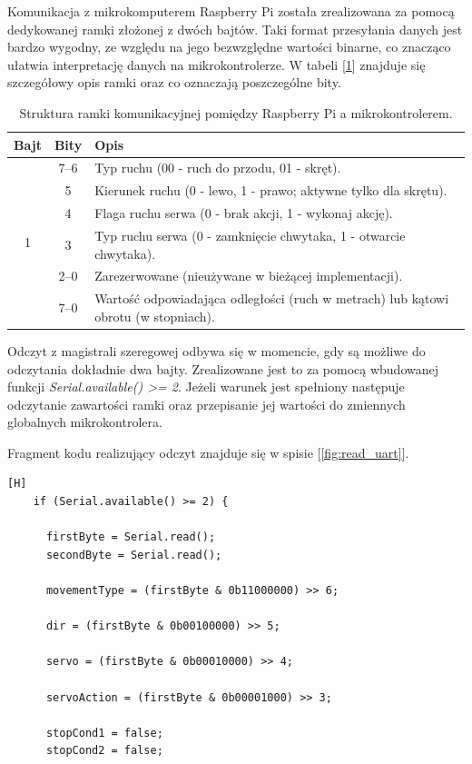 Komunikacja z mikrokomputerem Raspberry Pi została zrealizowana za pomocą dedykowanej ramki złożonej z dwóch bajtów. Taki format przesyłania danych jest bardzo wygodny, ze względu na jego bezwzględne wartości binarne, co znacząco ułatwia interpretację danych na mikrokontrolerze. W tabeli [\ref{tab:komunikacja_ramka}] znajduje się szczegółowy opis ramki oraz co oznaczają poszczególne bity. 

\begin{table}[H]
  \centering
  \begin{tabular}{|c|c|p{10cm}|}
      \hline
      \textbf{Bajt} & \textbf{Bity} & \textbf{Opis} \\
      \hline
      \multirow{8}{*}{1} & 7--6 & Typ ruchu (00 - ruch do przodu, 01 - skręt). \\
      \cline{2-3}
                        & 5    & Kierunek ruchu (0 - lewo, 1 - prawo; aktywne tylko dla skrętu). \\
      \cline{2-3}
                        & 4    & Flaga ruchu serwa (0 - brak akcji, 1 - wykonaj akcję). \\
      \cline{2-3}
                        & 3    & Typ ruchu serwa (0 - zamknięcie chwytaka, 1 - otwarcie chwytaka). \\
      \cline{2-3}
                        & 2--0 & Zarezerwowane (nieużywane w bieżącej implementacji). \\
      \hline
      \multirow{8}{*}{1} & 7--0 & Wartość odpowiadająca odległości (ruch w metrach) lub kątowi obrotu (w stopniach). \\
      \hline
  \end{tabular}
  \caption{Struktura ramki komunikacyjnej pomiędzy Raspberry Pi a mikrokontrolerem.}
  \label{tab:komunikacja_ramka}
\end{table}

Odczyt z magistrali szeregowej odbywa się w momencie, gdy są możliwe do odczytania dokładnie dwa bajty. Zrealizowane jest to za pomocą wbudowanej funkcji \textit{Serial.available() >= 2}. Jeżeli warunek jest spełniony następuje odczytanie zawartości ramki oraz przepisanie jej wartości do zmiennych globalnych mikrokontrolera. 

Fragment kodu realizujący odczyt znajduje się w spisie [\ref{fig:read_uart}].

\vspace*{0.5cm}


\begin{lstlisting}[caption=Fragment przedstawiający odczyt ramki bitowej z magistrali szeregowej, label=fig:read_uart, captionpos=b][H]
    if (Serial.available() >= 2) {  
      
      firstByte = Serial.read();
      secondByte = Serial.read();

      movementType = (firstByte & 0b11000000) >> 6;

      dir = (firstByte & 0b00100000) >> 5;

      servo = (firstByte & 0b00010000) >> 4;

      servoAction = (firstByte & 0b00001000) >> 3;

      stopCond1 = false;
      stopCond2 = false;
\end{lstlisting}


